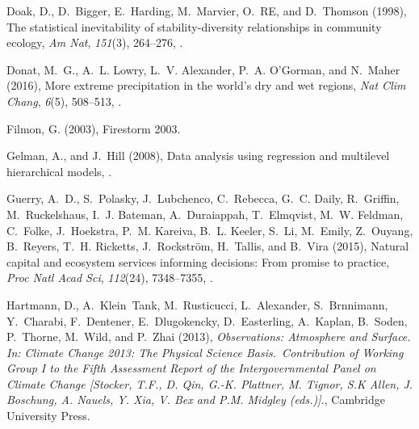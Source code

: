 \documentclass{AGUJournal}
\begin{document}
\begin{thebibliography}{38}
Doak, D., D.~Bigger, E.~Harding, M.~Marvier, O.~{RE}, and D.~Thomson (1998),
		The statistical inevitability of stability{-}diversity relationships in
  community ecology, \textit{Am Nat}, \textit{151}(3), 264--276,
  .

Donat, M.~G., A.~L. Lowry, L.~V. Alexander, P.~A. {O'Gorman}, and N.~Maher
  (2016), More extreme precipitation in the world's dry and wet regions,
  \textit{Nat Clim Chang}, \textit{6}(5), 508--513, .

Filmon, G. (2003), Firestorm 2003.

Gelman, A., and J.~Hill (2008), Data analysis using regression and multilevel
  hierarchical models, .

Guerry, A.~D., S.~Polasky, J.~Lubchenco, C.~Rebecca, G.~C. Daily, R.~Griffin,
  M.~Ruckelshaus, I.~J. Bateman, A.~Duraiappah, T.~Elmqvist, M.~W. Feldman,
  C.~Folke, J.~Hoekstra, P.~M. Kareiva, B.~L. Keeler, S.~Li, M.~Emily,
  Z.~Ouyang, B.~Reyers, T.~H. Ricketts, J.~Rockstr{\"o}m, H.~Tallis, and
  B.~Vira (2015), Natural capital and ecosystem services informing decisions:
  From promise to practice, \textit{Proc Natl Acad Sci}, \textit{112}(24),
  7348--7355, .

Hartmann, D., A.~Klein~Tank, M.~Rusticucci, L.~Alexander,
  S.~Brnnimann, Y.~Charabi, F.~Dentener, E.~Dlugokencky,
  D.~Easterling, A.~Kaplan, B.~Soden, P.~Thorne, M.~Wild, and P.~Zhai (2013),
  \textit{Observations: {Atmosphere and Surface}. In: {Climate Change 2013}:
  The Physical Science Basis.~Contribution of Working Group I to the Fifth
  Assessment Report of the {Intergovernmental Panel on Climate Change}
  {[Stocker, T.F., D. Qin, G.-K. Plattner, M. Tignor, S.K Allen, J. Boschung,
  A. Nauels, Y. Xia, V. Bex and P.M. Midgley (eds.)].}}, Cambridge University
  Press.


\end{thebibliography}
\end{document}
